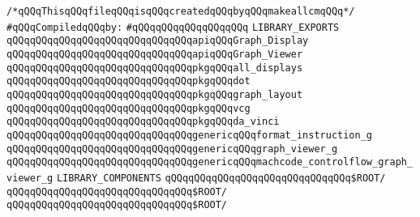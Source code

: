 \label{src/lib/compiler/back/low/lib/visual.lib}
\verb|/*qQQqThisqQQqfileqQQqisqQQqcreatedqQQqbyqQQqmakeallcmqQQq*/|\newline
\newline
\verb|#qQQqCompiledqQQqby:|\newline
\verb|#qQQqqQQqqQQqqQQqqQQq|\newline
\newline
\verb|LIBRARY_EXPORTS|\newline
\newline
\verb|qQQqqQQqqQQqqQQqqQQqqQQqqQQqqQQqapiqQQqGraph_Display|\newline
\verb|qQQqqQQqqQQqqQQqqQQqqQQqqQQqqQQqapiqQQqGraph_Viewer|\newline
\newline
\verb|qQQqqQQqqQQqqQQqqQQqqQQqqQQqqQQqpkgqQQqall_displays|\newline
\verb|qQQqqQQqqQQqqQQqqQQqqQQqqQQqqQQqpkgqQQqdot|\newline
\verb|qQQqqQQqqQQqqQQqqQQqqQQqqQQqqQQqpkgqQQqgraph_layout|\newline
\verb|qQQqqQQqqQQqqQQqqQQqqQQqqQQqqQQqpkgqQQqvcg|\newline
\verb|qQQqqQQqqQQqqQQqqQQqqQQqqQQqqQQqpkgqQQqda_vinci|\newline
\newline
\verb|qQQqqQQqqQQqqQQqqQQqqQQqqQQqqQQqgenericqQQqformat_instruction_g|\newline
\verb|qQQqqQQqqQQqqQQqqQQqqQQqqQQqqQQqgenericqQQqgraph_viewer_g|\newline
\verb|qQQqqQQqqQQqqQQqqQQqqQQqqQQqqQQqgenericqQQqmachcode_controlflow_graph_viewer_g|\newline
\newline
\newline
\newline
\verb|LIBRARY_COMPONENTS|\newline
\newline
\newline
\verb|qQQqqQQqqQQqqQQqqQQqqQQqqQQqqQQq$ROOT/|\newline
\verb|qQQqqQQqqQQqqQQqqQQqqQQqqQQqqQQq$ROOT/|\newline
\newline
\verb|qQQqqQQqqQQqqQQqqQQqqQQqqQQqqQQq$ROOT/|\newline
